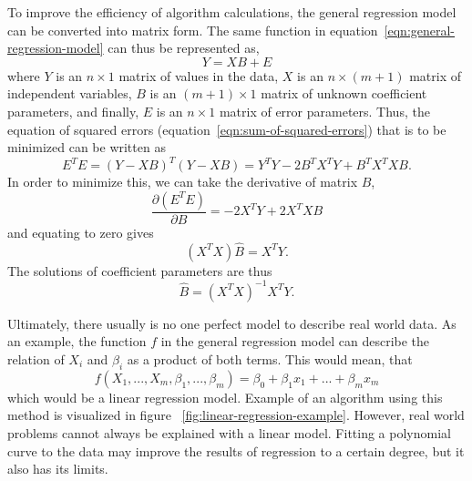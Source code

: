 To improve the efficiency of algorithm calculations,
the general regression model can be converted into matrix form.
The same function in equation~\ref{eqn:general-regression-model}
can thus be represented as,
\begin{equation}
    Y = XB+E
\end{equation}
where $Y$ is an $n\times1$ matrix of values in the data,
$X$ is an $n\times(m+1)$ matrix of independent variables,
$B$ is an $(m+1)\times1$ matrix of unknown coefficient parameters,
and finally, $E$ is an $n\times1$ matrix of error parameters.
Thus, the equation of squared errors (equation~\ref{eqn:sum-of-squared-errors})
that is to be minimized can be written as
\begin{equation}
    E^{T}E = (Y-XB)^{T}(Y-XB) = Y^{T}Y-2B^{T}X^{T}Y+B^{T}X^{T}XB.
\end{equation}
In order to minimize this, we can take the derivative of matrix $B$,
\begin{equation}
    \frac{\partial(E^{T}E)}{\partial B} = -2X^{T}Y + 2X^{T}XB
\end{equation}
and equating to zero gives
\begin{equation}
    (X^{T}X)\hat{B} = X^{T}Y.
\end{equation}
The solutions of coefficient parameters are thus
\begin{equation}
    \hat{B} = (X^{T}X)^{-1}X^{T}Y.
\end{equation}

Ultimately,
there usually is no one perfect model to describe real world data.
As an example,
the function $f$ in the general regression model
can describe the relation of $X_{i}$ and $\beta_{i}$ as a product of both terms.
This would mean, that
\begin{equation}
    f(X_{1},...,X_{m},\beta_{1},...,\beta_{m})=\beta_{0}+\beta_{1}x_{1}+...+\beta_{m}x_{m}
\end{equation}
which would be a linear regression model.
Example of an algorithm using this method
is visualized in figure ~\ref{fig:linear-regression-example}.
However,
real world problems cannot always be explained with a linear model.
Fitting a polynomial curve to the data
may improve the results of regression to a certain degree,
but it also has its limits.

